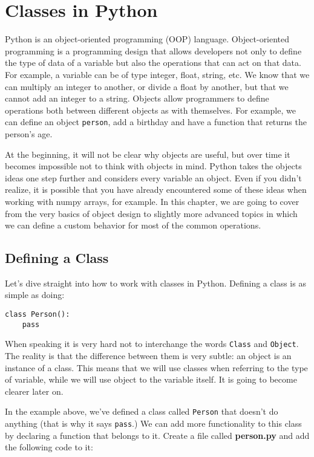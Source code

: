 \chapter{Classes in Python}\label{classes-in-python}
Python is an object-oriented programming (OOP) language. Object-oriented
programming is a programming design that allows developers not only to
define the type of data of a variable but also the operations that can
act on that data. For example, a variable can be of type integer, float,
string, etc. We know that we can multiply an integer to another, or
divide a float by another, but that we cannot add an integer to a
string. Objects allow programmers to define operations both between
different objects as with themselves. For example, we can define an object
\texttt{person}, add a birthday and have a function that returns the
person's age.

At the beginning, it will not be clear why objects are useful, but over
time it becomes impossible not to think with objects in mind. Python
takes the objects ideas one step further and considers every variable
an object. Even if you didn't realize, it is possible that you have
already encountered some of these ideas when working with numpy arrays,
for example. In this chapter, we are going to cover from the very basics
of object design to slightly more advanced topics in which we can define a 
custom behavior for most of the common operations.

\section{Defining a Class}\label{defining-a-class}
Let's dive straight into how to work with classes in Python. Defining a class is as
simple as doing:

\begin{verbatim}
class Person():
    pass
\end{verbatim}

When speaking it is very hard not to interchange the words
\texttt{Class} and \texttt{Object}. The reality is that the difference
between them is very subtle: an object is an instance of a class. This
means that we will use classes when referring to the type of variable,
while we will use object to the variable itself. It is going to become clearer
later on.

In the example above, we've defined a class called \texttt{Person} that doesn't do
anything (that is why it says \texttt{pass}.) We can add more
functionality to this class by declaring a function that belongs to it. Create a file called \textbf{person.py} and add the following code to it:

